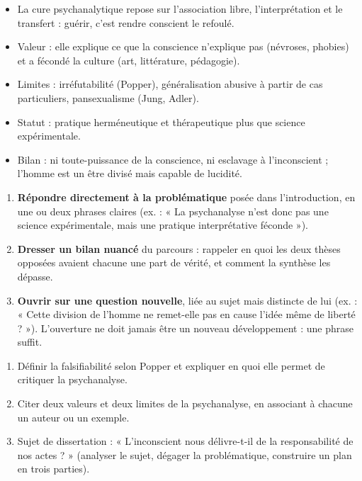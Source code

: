 \documentclass[11pt]{article}
\begin{document}
\begin{aretenir}
\begin{itemize}
\item La cure psychanalytique repose sur l'association libre, l'interprétation et le transfert : guérir, c'est rendre conscient le refoulé.
\item Valeur : elle explique ce que la conscience n'explique pas (névroses, phobies) et a fécondé la culture (art, littérature, pédagogie).
\item Limites : irréfutabilité (Popper), généralisation abusive à partir de cas particuliers, pansexualisme (Jung, Adler).
\item Statut : pratique herméneutique et thérapeutique plus que science expérimentale.
\item Bilan : ni toute-puissance de la conscience, ni esclavage à l'inconscient ; l'homme est un être divisé mais capable de lucidité.
\end{itemize}
\end{aretenir}

\begin{methode}
\begin{enumerate}
\item \textbf{Répondre directement à la problématique} posée dans l'introduction, en une ou deux phrases claires (ex. : « La psychanalyse n'est donc pas une science expérimentale, mais une pratique interprétative féconde »).
\item \textbf{Dresser un bilan nuancé} du parcours : rappeler en quoi les deux thèses opposées avaient chacune une part de vérité, et comment la synthèse les dépasse.
\item \textbf{Ouvrir sur une question nouvelle}, liée au sujet mais distincte de lui (ex. : « Cette division de l'homme ne remet-elle pas en cause l'idée même de liberté ? »). L'ouverture ne doit jamais être un nouveau développement : une phrase suffit.
\end{enumerate}
\end{methode}

\begin{exercice}
\begin{enumerate}
\item Définir la falsifiabilité selon Popper et expliquer en quoi elle permet de critiquer la psychanalyse.
\item Citer deux valeurs et deux limites de la psychanalyse, en associant à chacune un auteur ou un exemple.
\item Sujet de dissertation : « L'inconscient nous délivre-t-il de la responsabilité de nos actes ? » (analyser le sujet, dégager la problématique, construire un plan en trois parties).
\end{enumerate}
\end{exercice}
\end{document}
